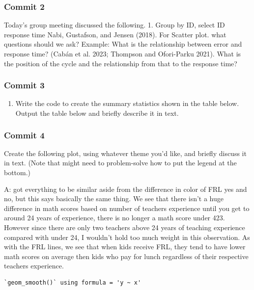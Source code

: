 \documentclass[
  letterpaper,
  DIV=11,
  numbers=noendperiod]{scrartcl}
\providecommand{\tightlist}{%
  \setlength{\itemsep}{0pt}\setlength{\parskip}{0pt}}\usepackage{longtable,booktabs,array}
\begin{document}
\subsubsection{Commit 2}\label{commit-2}

Today's group meeting discussed the following. 1. Group by ID, select ID
response time Nabi, Gustafson, and Jensen (2018). For Scatter plot. what
questions should we ask? Example: What is the relationship between error
and response time? (Cabán et al. 2023; Thompson and Ofori-Parku 2021).
What is the position of the cycle and the relationship from that to the
response time?

\subsubsection{\texorpdfstring{\textbf{Commit
3}}{Commit 3}}\label{commit-3}

\begin{enumerate}
\def\labelenumi{\arabic{enumi}.}
\tightlist
\item
  Write the code to create the summary statistics shown in the table
  below. Output the table below and briefly describe it in text.
\end{enumerate}

\subsubsection{Commit 4}\label{commit-4}

Create the following plot, using whatever theme you'd like, and briefly
discuss it in text. (Note that might need to problem-solve how to put
the legend at the bottom.)

A: got everything to be similar aside from the difference in color of
FRL yes and no, but this says basically the same thing. We see that
there isn't a huge difference in math scores based on number of teachers
experience until you get to around 24 years of experience, there is no
longer a math score under 423. However since there are only two teachers
above 24 years of teaching experience compared with under 24, I wouldn't
hold too much weight in this observation. As with the FRL lines, we see
that when kids receive FRL, they tend to have lower math scores on
average then kids who pay for lunch regardless of their respective
teachers experience.

\begin{verbatim}
`geom_smooth()` using formula = 'y ~ x'
\end{verbatim}
\end{document}
